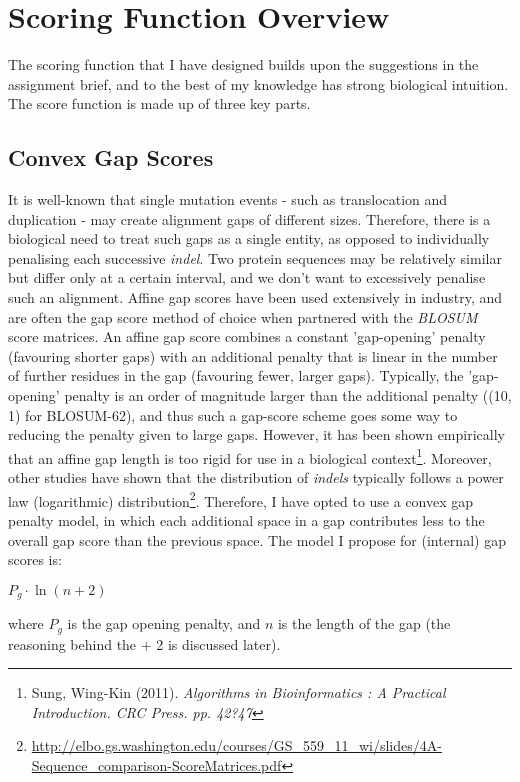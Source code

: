 \documentclass[a4paper]{article}
\begin{document}
\section{Scoring Function Overview}
The scoring function that I have designed builds upon the suggestions in the assignment brief, and to the best of my knowledge has strong biological intuition. The score function is made up of three key parts. 
\subsection{Convex Gap Scores}
It is well-known that single mutation events - such as translocation and duplication - may create alignment gaps of different sizes. Therefore, there is a biological need to treat such gaps as a single entity, as opposed to individually penalising each successive \textit{indel}. Two protein sequences may be relatively similar but differ only at a certain interval, and we don't want to excessively penalise such an alignment. Affine gap scores have been used extensively in industry, and are often the gap score method of choice when partnered with the \textit{BLOSUM} score matrices. An affine gap score combines a constant 'gap-opening' penalty (favouring shorter gaps) with an additional penalty that is linear in the number of further residues in the gap (favouring fewer, larger gaps). Typically, the 'gap-opening' penalty is an order of magnitude larger than the additional penalty ((10, 1) for BLOSUM-62), and thus such a gap-score scheme goes some way to reducing the penalty given to large gaps. However, it has been shown empirically that an affine gap length is too rigid for use in a biological context\footnote{Sung, Wing-Kin (2011). \textit{Algorithms in Bioinformatics : A Practical Introduction. CRC Press. pp. 42?47}}. Moreover, other studies have shown that the distribution of \textit{indels} typically follows a power law (logarithmic) distribution\footnote{\url{http://elbo.gs.washington.edu/courses/GS_559_11_wi/slides/4A-Sequence_comparison-ScoreMatrices.pdf}}. Therefore, I have opted to use a convex gap penalty model, in which each additional space in a gap contributes less to the overall gap score than the previous space. The model I propose for (internal) gap scores is:
\begin{center}
$P_g \cdot \ln(n + 2) $
\end {center}
where $P_g$ is the gap opening penalty, and $n$ is the length of the gap (the reasoning behind the + 2 is discussed later).
\end{document}
